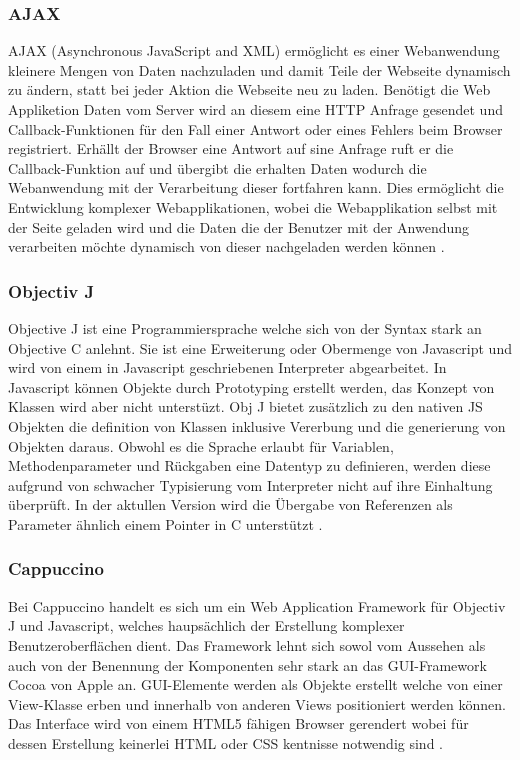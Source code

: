 \subsubsection{AJAX}
\label{sec:AJAX}
AJAX (Asynchronous JavaScript and XML) ermöglicht es einer Webanwendung kleinere Mengen von Daten nachzuladen und damit Teile der Webseite dynamisch zu ändern, 
statt bei jeder Aktion die Webseite neu zu laden.
Benötigt die Web Appliketion Daten vom Server wird an diesem eine HTTP Anfrage gesendet und Callback-Funktionen für den Fall einer Antwort oder eines Fehlers beim Browser registriert.
Erhällt der Browser eine Antwort auf sine Anfrage ruft er die Callback-Funktion auf und übergibt die erhalten Daten wodurch die Webanwendung mit der Verarbeitung dieser fortfahren kann.
Dies ermöglicht die Entwicklung komplexer Webapplikationen, wobei die Webapplikation selbst mit der Seite geladen wird und die Daten die der Benutzer mit der Anwendung verarbeiten möchte dynamisch von dieser nachgeladen werden können \cite{ajax}.

\subsubsection{Objectiv J}
\label{sec:Objectiv J}

Objective J ist eine Programmiersprache welche sich von der Syntax stark an Objective C anlehnt.
Sie ist eine Erweiterung oder Obermenge von Javascript und wird von einem in Javascript geschriebenen Interpreter abgearbeitet.
In Javascript können Objekte durch Prototyping erstellt werden, das Konzept von Klassen wird aber nicht unterstüzt.
Obj J bietet zusätzlich zu den nativen JS Objekten die definition von Klassen inklusive Vererbung und die generierung von Objekten daraus.
Obwohl es die Sprache erlaubt für Variablen, Methodenparameter und Rückgaben eine Datentyp zu definieren, 
werden diese aufgrund von schwacher Typisierung vom Interpreter nicht auf ihre Einhaltung überprüft.
In der aktullen Version wird die Übergabe von Referenzen als Parameter ähnlich einem Pointer in C unterstützt \cite{capp}.

\subsubsection{Cappuccino}
\label{sec:Cappuccino}
Bei Cappuccino handelt es sich um ein Web Application Framework für Objectiv J und Javascript, welches haupsächlich der Erstellung komplexer Benutzeroberflächen dient.
Das Framework lehnt sich sowol vom Aussehen als auch von der Benennung der Komponenten sehr stark an das GUI-Framework Cocoa von Apple an.
GUI-Elemente werden als Objekte erstellt welche von einer View-Klasse erben und innerhalb von anderen Views positioniert werden können.
Das Interface wird von einem HTML5 fähigen Browser gerendert wobei für dessen Erstellung keinerlei HTML oder CSS kentnisse notwendig sind \cite{capp}.


